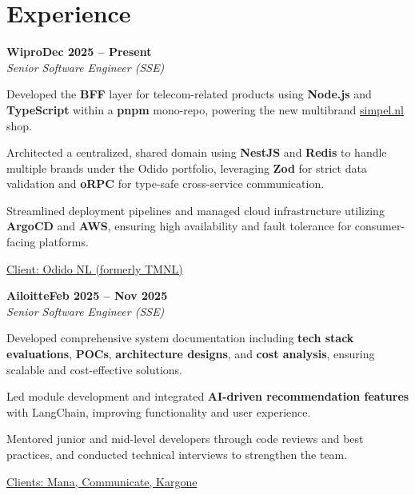 \documentclass[letterpaper,10pt]{article}
\newcommand{\heading}[2]{
  \hspace{10pt}#1\hfill#2\\
}
\newcommand{\headingBf}[2]{
  \heading{\textbf{#1}}{\textbf{#2}}
}
\newcommand{\headingIt}[2]{
  \heading{\textit{#1}}{\textit{#2}}
}
\newenvironment{resume_list}{
  \vspace{-7pt}
  \begin{itemize}[itemsep=-2px, parsep=1pt, leftmargin=30pt]
}{
  \end{itemize}
}
\newcommand{\itemTitle}[1]{
  \item[] \underline{#1}\vspace{4pt}
}
\begin{document}

  \section{Experience}

  \headingBf{Wipro}{Dec 2025 -- Present}
  \headingIt{Senior Software Engineer (SSE)}{}
  \begin{resume_list}
    \item Developed the \textbf{BFF} layer for telecom-related products using \textbf{Node.js} and \textbf{TypeScript} within a \textbf{pnpm} mono-repo, powering the new multibrand \href{https://simpel.nl}{simpel.nl} shop.
    \item Architected a centralized, shared domain using \textbf{NestJS} and \textbf{Redis} to handle multiple brands under the Odido portfolio, leveraging \textbf{Zod} for strict data validation and \textbf{oRPC} for type-safe cross-service communication.
    \item Streamlined deployment pipelines and managed cloud infrastructure utilizing \textbf{ArgoCD} and \textbf{AWS}, ensuring high availability and fault tolerance for consumer-facing platforms.
    \itemTitle{Client: Odido NL (formerly TMNL)}
  \end{resume_list}

  \headingBf{Ailoitte}{Feb 2025 -- Nov 2025}
  \headingIt{Senior Software Engineer (SSE)}{}
  \begin{resume_list}
    \item Developed comprehensive system documentation including \textbf{tech stack evaluations}, \textbf{POCs}, \textbf{architecture designs}, and \textbf{cost analysis}, ensuring scalable and cost-effective solutions.  
    \item Led module development and integrated \textbf{AI-driven recommendation features} with LangChain, improving functionality and user experience.
    \item Mentored junior and mid-level developers through code reviews and best practices, and conducted technical interviews to strengthen the team.
    \itemTitle{Clients: Mana, Communicate, Kargone}
  \end{resume_list}
\end{document}
